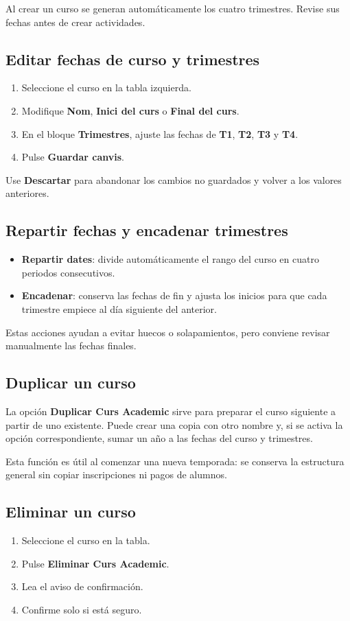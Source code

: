 \documentclass[12pt]{article}
\newcommand{\boton}[1]{\textbf{#1}}
\newcommand{\menu}[1]{\textbf{#1}}
\newcommand{\campo}[1]{\textbf{#1}}
\begin{document}
Al crear un curso se generan automáticamente los cuatro trimestres. Revise sus fechas antes de crear actividades.

\subsection{Editar fechas de curso y trimestres}
\begin{enumerate}
  \item Seleccione el curso en la tabla izquierda.
  \item Modifique \campo{Nom}, \campo{Inici del curs} o \campo{Final del curs}.
  \item En el bloque \menu{Trimestres}, ajuste las fechas de \campo{T1}, \campo{T2}, \campo{T3} y \campo{T4}.
  \item Pulse \boton{Guardar canvis}.
\end{enumerate}

Use \boton{Descartar} para abandonar los cambios no guardados y volver a los valores anteriores.

\subsection{Repartir fechas y encadenar trimestres}
\begin{itemize}
  \item \boton{Repartir dates}: divide automáticamente el rango del curso en cuatro periodos consecutivos.
  \item \boton{Encadenar}: conserva las fechas de fin y ajusta los inicios para que cada trimestre empiece al día siguiente del anterior.
\end{itemize}

Estas acciones ayudan a evitar huecos o solapamientos, pero conviene revisar manualmente las fechas finales.

\subsection{Duplicar un curso}
La opción \boton{Duplicar Curs Academic} sirve para preparar el curso siguiente a partir de uno existente. Puede crear una copia con otro nombre y, si se activa la opción correspondiente, sumar un año a las fechas del curso y trimestres.

Esta función es útil al comenzar una nueva temporada: se conserva la estructura general sin copiar inscripciones ni pagos de alumnos.

\subsection{Eliminar un curso}
\begin{enumerate}
  \item Seleccione el curso en la tabla.
  \item Pulse \boton{Eliminar Curs Academic}.
  \item Lea el aviso de confirmación.
  \item Confirme solo si está seguro.
\end{enumerate}
\end{document}

